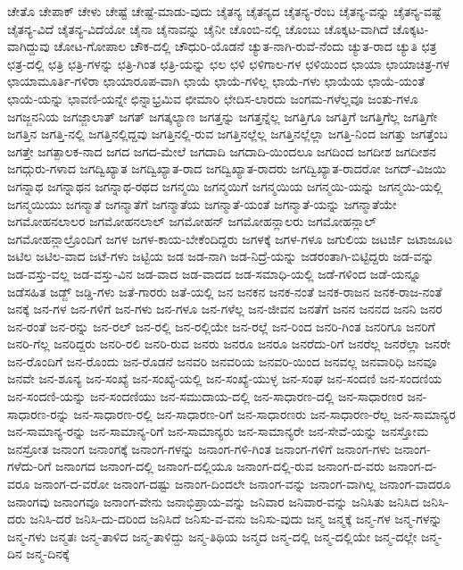 {ಚೇತೊ
ಚೇಪಾಕ್
ಚೇಳು
ಚೇಷ್ಟೆ
ಚೇಷ್ಟೆ-ಮಾಡು-ವುದು
ಚೈತನ್ಯ
ಚೈತನ್ಯದ
ಚೈತನ್ಯ-ರೆಂಬ
ಚೈತನ್ಯ-ವನ್ನು
ಚೈತನ್ಯ-ವಷ್ಟೆ
ಚೈತನ್ಯ-ವಿದೆ
ಚೈತನ್ಯ-ವಿದೆಯೋ
ಚೈನಾ
ಚೈನಾವನ್ನು
ಚೈನೀ
ಚೊಂಬಿ-ನಲ್ಲಿ
ಚೊಂಬು
ಚೊಕ್ಕಟ-ವಾಗಿದೆ
ಚೊಕ್ಕಟ-ವಾಗಿದ್ದುವು
ಚೋಟ-ಗೋಪಾಲ
ಚೌಕ-ದಲ್ಲಿ
ಚೌಧುರಿ-ಯೊಡನೆ
ಚ್ಯುತ-ನಾಗಿ-ರುವೆ-ನೆಂದು
ಚ್ಯುತ-ರಾದ
ಚ್ಯುತಿ
ಛತ್ರ
ಛತ್ರ-ದಲ್ಲಿ
ಛತ್ರಿ
ಛತ್ರಿ-ಗಳನ್ನು
ಛತ್ರಿ-ಗಿಂತ
ಛತ್ರಿ-ಯನ್ನು
ಛಲ
ಛಳಿ
ಛಳಿಗಾಲ-ಗಳ
ಛಳಿಯಿಂದ
ಛಾಯಾ
ಛಾಯಾಚಿತ್ರ-ಗಳ
ಛಾಯಾಮೂರ್ತಿ-ಗಳಿರಾ
ಛಾಯಾರೂಪ-ವಾಗಿ
ಛಾಯೆ
ಛಾಯೆ-ಗಳಿಲ್ಲ
ಛಾಯೆ-ಗಳು
ಛಾಯೆಯ
ಛಾಯೆ-ಯಂತೆ
ಛಾಯೆ-ಯನ್ನು
ಛಾವಣಿ-ಯನ್ನೇ
ಛಿನ್ನಾಭ್ರಮಿವ
ಛೀಮಾರಿ
ಛೇದಿಸ-ಲಾರದು
ಜಂಗಮ-ಗಳೆಲ್ಲವೂ
ಜಂತು-ಗಳೂ
ಜಗಜ್ಜನನಿಯ
ಜಗಜ್ಜಾಲಾತ್
ಜಗತ್
ಜಗತ್ಕಲ್ಯಾಣ
ಜಗತ್ತನ್ನು
ಜಗತ್ತನ್ನೆಲ್ಲ
ಜಗತ್ತಿಗೂ
ಜಗತ್ತಿಗೆ
ಜಗತ್ತಿಗೆಲ್ಲ
ಜಗತ್ತಿಗೇ
ಜಗತ್ತಿನ
ಜಗತ್ತಿ-ನಲ್ಲಿ
ಜಗತ್ತಿನಲ್ಲಿದ್ದವು
ಜಗತ್ತಿನಲ್ಲಿ-ರುವ
ಜಗತ್ತಿನಲ್ಲೆಲ್ಲ
ಜಗತ್ತಿನಲ್ಲೆಲ್ಲಾ
ಜಗತ್ತಿ-ನಿಂದ
ಜಗತ್ತು
ಜಗತ್ತೆಂಬ
ಜಗತ್ತೇ
ಜಗತ್ಪಾಲಕ-ನಾದ
ಜಗದ
ಜಗದ-ಮೇಲೆ
ಜಗದಾದಿ
ಜಗದಾದಿ-ಯಿಂದಲೂ
ಜಗದಿಂದ
ಜಗದೀಶ
ಜಗದೀಶನ
ಜಗದ್ಗುರು-ಗಳಾದ
ಜಗದ್ವಿಖ್ಯಾತ
ಜಗದ್ವಿಖ್ಯಾತ-ರಾದ
ಜಗದ್ವಿಖ್ಯಾತ-ರಾದರು
ಜಗದ್ವಿಖ್ಯಾತ-ರಾದರೋ
ಜಗದ್-ವಿಜಯಿ
ಜಗನ್ನಾಥ
ಜಗನ್ನಾಥನ
ಜಗನ್ನಾಥ-ರಥದ
ಜಗನ್ಮಯಿ
ಜಗನ್ಮಯಿಗೆ
ಜಗನ್ಮಯಿಯ
ಜಗನ್ಮಯಿ-ಯನ್ನು
ಜಗನ್ಮಯಿ-ಯಲ್ಲಿ
ಜಗನ್ಮಯಿಯು
ಜಗನ್ಮಾತೆ
ಜಗನ್ಮಾತೆಗೆ
ಜಗನ್ಮಾತೆಯ
ಜಗನ್ಮಾತೆ-ಯಂತೆ
ಜಗನ್ಮಾತೆ-ಯನ್ನು
ಜಗನ್ಮಾತೆಯೇ
ಜಗಮೋಹನಲಾಲರ
ಜಗಮೋಹನಲಾಲ್
ಜಗಮೋಹನ್
ಜಗಮೋಹನ್ಲಾಲರು
ಜಗಮೋಹನ್ಲಾಲ್
ಜಗಮೋಹನ್ಲಾಲ್ರೊಂದಿಗೆ
ಜಗಳ
ಜಗಳ-ಕಾಯ-ಬೇಕೆಂದಿದ್ದರು
ಜಗಳಕ್ಕೆ
ಜಗಳ-ಗಳೂ
ಜಗುಲಿಯ
ಜಟರ್ಜಿ
ಜಟಾಜೂಟ
ಜಟಿಲ
ಜಟಿಲ-ವಾದ
ಜಟೆ-ಗಳು
ಜಟ್ಟಿಯ
ಜಡ
ಜಡ-ನಾಗಿ
ಜಡ-ನಿದ್ರೆ-ಯನ್ನು
ಜಡರಂತಾಗಿ-ಬಿಟ್ಟಿದ್ದರು
ಜಡ-ವನ್ನು
ಜಡ-ವಸ್ತು-ವಲ್ಲ
ಜಡ-ವಸ್ತು-ವಿನ
ಜಡ-ವಾದ
ಜಡ-ವಾದದ
ಜಡ-ಸಮಾಧಿ-ಯಲ್ಲಿ
ಜಡೆ-ಗಳಿಂದ
ಜಡೆ-ಯನ್ನೂ
ಜಡೆಸಹಿತ
ಜಡ್ಜ್
ಜಡ್ಡಿ-ಗಳು
ಜತೆ-ಗಾರರು
ಜತೆ-ಯಲ್ಲಿ
ಜನ
ಜನಕನ
ಜನಕ-ನಂತೆ
ಜನಕ-ರಾಜನ
ಜನಕ-ರಾಜ-ನಂತೆ
ಜನಕ್ಕೆ
ಜನ-ಗಳ
ಜನ-ಗಳಿಗೆ
ಜನ-ಗಳು
ಜನ-ಗಳೂ
ಜನ-ಗಳೆಲ್ಲ
ಜನ-ಜೀವನ
ಜನತೆಗೆ
ಜನನ
ಜನನದ
ಜನನಿ
ಜನರ
ಜನ-ರಂತೆ
ಜನ-ರನ್ನು
ಜನ-ರಲ್
ಜನ-ರಲ್ಲಿ
ಜನ-ರಲ್ಲಿಯೇ
ಜನ-ರಲ್ಲೆ
ಜನ-ರಿಂದ
ಜನರಿ-ಗಿಂತ
ಜನರಿಗೂ
ಜನರಿಗೆ
ಜನರಿ-ಗೆಲ್ಲ
ಜನರಿದ್ದರು
ಜನರಿ-ರಲಿ
ಜನರಿ-ರುವ
ಜನರು
ಜನರೂ
ಜನರೂ
ಜನರೆದು-ರಿಗೆ
ಜನರೆಲ್ಲ
ಜನರೆಲ್ಲಾ
ಜನರೇ
ಜನ-ರೊಂದಿಗೆ
ಜನ-ರೊಂದು
ಜನ-ರೊಡನೆ
ಜನವರಿ
ಜನವರಿಯ
ಜನವರಿ-ಯಿಂದ
ಜನವಲ್ಲ
ಜನವಾರಿಧಿ
ಜನವೂ
ಜನವೇ
ಜನ-ಶೂನ್ಯ
ಜನ-ಸಂಖ್ಯೆ
ಜನ-ಸಂಖ್ಯೆ-ಯಲ್ಲಿ
ಜನ-ಸಂಖ್ಯೆ-ಯುಳ್ಳ
ಜನ-ಸಂಘ
ಜನ-ಸಂದಣಿ
ಜನ-ಸಂದಣಿಯ
ಜನ-ಸಂದಣಿ-ಯನ್ನು
ಜನ-ಸಂದಣಿಯು
ಜನ-ಸಮುದಾಯ-ದಲ್ಲಿ
ಜನ-ಸಾಧಾರಣ-ದಲ್ಲಿ
ಜನ-ಸಾಧಾರಣರ
ಜನ-ಸಾಧಾರಣ-ರನ್ನು
ಜನ-ಸಾಧಾರಣ-ರಲ್ಲಿ
ಜನ-ಸಾಧಾರಣ-ರಿಗೆ
ಜನ-ಸಾಧಾರಣರು
ಜನ-ಸಾಧಾರಣ-ರೆಲ್ಲ
ಜನ-ಸಾಮಾನ್ಯರ
ಜನ-ಸಾಮಾನ್ಯ-ರನ್ನು
ಜನ-ಸಾಮಾನ್ಯ-ರಿಗೆ
ಜನ-ಸಾಮಾನ್ಯರು
ಜನ-ಸಾಮಾನ್ಯರೇ
ಜನ-ಸೇವೆ-ಯನ್ನು
ಜನಸ್ತೋಮ
ಜನಸ್ರೋತ
ಜನಾಂಗ
ಜನಾಂಗಕ್ಕೆ
ಜನಾಂಗ-ಗಳನ್ನು
ಜನಾಂಗ-ಗಳಿ-ಗಿಂತ
ಜನಾಂಗ-ಗಳಿಗೆ
ಜನಾಂಗ-ಗಳು
ಜನಾಂಗ-ಗಳೆದು-ರಿಗೆ
ಜನಾಂಗದ
ಜನಾಂಗ-ದಲ್ಲಿ
ಜನಾಂಗ-ದಲ್ಲಿಯೂ
ಜನಾಂಗ-ದಲ್ಲಿ-ರುವ
ಜನಾಂಗ-ದ-ವರು
ಜನಾಂಗ-ದ-ವರೂ
ಜನಾಂಗ-ದ-ವರೋ
ಜನಾಂಗ-ದಷ್ಟು
ಜನಾಂಗ-ದಿಂದಲೇ
ಜನಾಂಗ-ವನ್ನು
ಜನಾಂಗ-ವಾಗಿಲ್ಲ
ಜನಾಂಗ-ವಾದರೂ
ಜನಾಂಗವು
ಜನಾಂಗವೂ
ಜನಾಂಗ-ವೇನು
ಜನಾಭಿಪ್ರಾಯ-ವನ್ನು
ಜನಿವಾರ
ಜನಿವಾರ-ವನ್ನು
ಜನಿಸಿತು
ಜನಿಸಿದ
ಜನಿಸಿ-ದರು
ಜನಿಸಿ-ದರೆ
ಜನಿಸಿ-ದು-ದರಿಂದ
ಜನಿಸಿದೆ
ಜನಿಸು-ವ-ವನು
ಜನಿಸು-ವುದು
ಜನ್ಮ
ಜನ್ಮಕ್ಕೆ
ಜನ್ಮ-ಗಳ
ಜನ್ಮ-ಗಳನ್ನು
ಜನ್ಮ-ಗಳು
ಜನ್ಮತಃ
ಜನ್ಮ-ತಾಳಿದ
ಜನ್ಮ-ತಾಳಿದ್ದು
ಜನ್ಮ-ತಿಥಿಯ
ಜನ್ಮದ
ಜನ್ಮ-ದಲ್ಲಿ
ಜನ್ಮ-ದಲ್ಲಿಯೇ
ಜನ್ಮ-ದಲ್ಲೇ
ಜನ್ಮ-ದಿನ
ಜನ್ಮ-ದಿನಕ್ಕೆ
}
